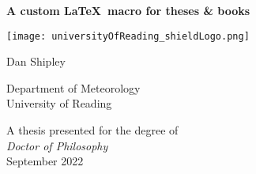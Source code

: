 \begin{titlepage}
    \begin{center}
        \vspace*{2em}
        
        \Huge
        \textbf{A custom \LaTeX\ macro for theses \& books}
        
        \vspace{5em}
        
        \texttt{[image: universityOfReading\_shieldLogo.png]}
        
        \vspace{3em}
              
        \LARGE
        Dan Shipley
        
        \vspace{0.5em}
        
        \large
        Department of Meteorology\\
        \vspace{0.5em}
        University of Reading\\
        
        \vspace{6em}
        
        A thesis presented for the degree of\\
        \vspace{0.5em}
        \emph{Doctor of Philosophy}\\
        \vspace{0.7em}
        September 2022
        
    \end{center}
\end{titlepage}